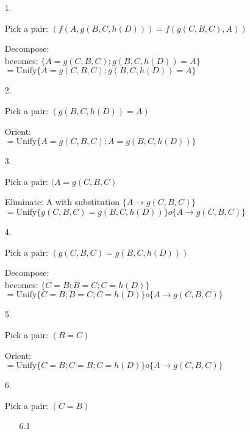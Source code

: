 \begin{enumerate}
	\item[1.]
	
	Pick a pair: \( (f(A, g(B,C,h(D) ) ) = f(g(C,B,C), A ) )\)
	
	Decompose: \\
	\hspace*{8mm}becomes: \( \{ A = g(C,B,C); g(B,C,h(D)) = A \} \) \\
	\hspace*{4mm}\( = \text{Unify} \{ A = g(C,B,C); g(B,C,h(D)) = A \} \)		
	
	\item[2.]
	
	Pick a pair: \( (g(B,C,h(D)) = A) \)
	
	Orient: \\
	\hspace*{4mm}\( = \text{Unify} \{ A = g(C,B,C); A = g(B,C,h(D)) \} \)	
		
	\item[3.]
	
	Pick a pair: \( (A = g(C,B,C) \)
	
	Eliminate: A with substitution \( \{ A \rightarrow g(C,B,C) \} \) \\
	\hspace*{4mm}\( = \text{Unify} \{ g(C,B,C) = g(B,C,h(D)) \} o \{ A \rightarrow g(C,B,C) \} \)		
		
	\item[4.]
	
	Pick a pair: \( (g(C,B,C) = g(B,C,h(D)) ) \)
	
	Decompose: \\
	\hspace*{8mm}becomes: \( \{ C = B; B = C; C = h(D)  \} \) \\
	\hspace*{4mm}\( = \text{Unify} \{ C = B; B = C; C = h(D) \} o \{ A \rightarrow g(C,B,C) \} \)		
		
	\item[5.]
	
	Pick a pair: \( ( B = C ) \)
	
	Orient: \\
	\hspace*{4mm}\( = \text{Unify} \{ C = B; C = B; C = h(D) \} o \{ A \rightarrow g(C,B,C) \} \)		
		
	\item[6.]
	
	Pick a pair: \( ( C = B ) \)
	
	\begin{enumerate}
	\item[6.1]
	

\end{enumerate}
\end{enumerate}
